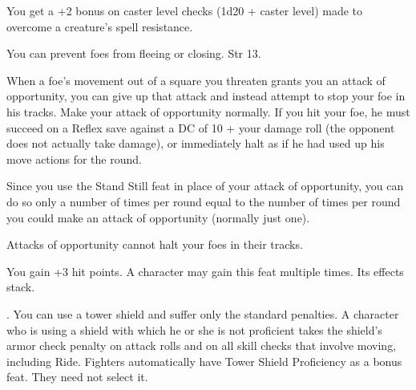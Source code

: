 {You get a +2 bonus on caster level checks (1d20 + caster level) made to overcome a creature's spell resistance.}

{You can prevent foes from fleeing or closing.}
{Str 13.}
{When a foe's movement out of a square you threaten grants you an attack of opportunity, you can give up that attack and instead attempt to stop your foe in his tracks. Make your attack of opportunity normally. If you hit your foe, he must succeed on a Reflex save against a DC of 10 + your damage roll (the opponent does not actually take damage), or immediately halt as if he had used up his move actions for the round.

Since you use the Stand Still feat in place of your attack of opportunity, you can do so only a number of times per round equal to the number of times per round you could make an attack of opportunity (normally just one).}
{Attacks of opportunity cannot halt your foes in their tracks.}{}

{}{}
{You gain +3 hit points.}{}
{A character may gain this feat multiple times. Its effects stack.}

{}
{.}
{You can use a tower shield and suffer only the standard penalties.}
{A character who is using a shield with which he or she is not proficient takes the shield's armor check penalty on attack rolls and on all skill checks that involve moving, including Ride.}
{Fighters automatically have Tower Shield Proficiency as a bonus feat. They need not select it.}

